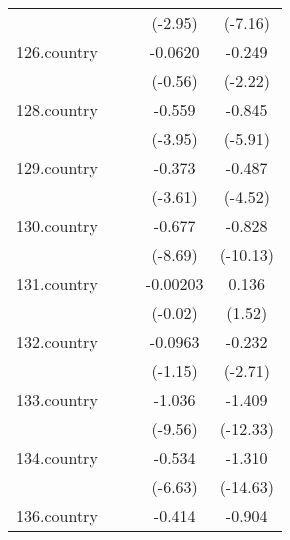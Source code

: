 {\begin{tabular}{l*{4}{c}}
            &                     &                     &     (-2.95)         &     (-7.16)         \\
[1em]
126.country &                     &                     &     -0.0620         &      -0.249\sym{*}  \\
            &                     &                     &     (-0.56)         &     (-2.22)         \\
[1em]
128.country &                     &                     &      -0.559\sym{***}&      -0.845\sym{***}\\
            &                     &                     &     (-3.95)         &     (-5.91)         \\
[1em]
129.country &                     &                     &      -0.373\sym{***}&      -0.487\sym{***}\\
            &                     &                     &     (-3.61)         &     (-4.52)         \\
[1em]
130.country &                     &                     &      -0.677\sym{***}&      -0.828\sym{***}\\
            &                     &                     &     (-8.69)         &    (-10.13)         \\
[1em]
131.country &                     &                     &    -0.00203         &       0.136         \\
            &                     &                     &     (-0.02)         &      (1.52)         \\
[1em]
132.country &                     &                     &     -0.0963         &      -0.232\sym{**} \\
            &                     &                     &     (-1.15)         &     (-2.71)         \\
[1em]
133.country &                     &                     &      -1.036\sym{***}&      -1.409\sym{***}\\
            &                     &                     &     (-9.56)         &    (-12.33)         \\
[1em]
134.country &                     &                     &      -0.534\sym{***}&      -1.310\sym{***}\\
            &                     &                     &     (-6.63)         &    (-14.63)         \\
[1em]
136.country &                     &                     &      -0.414\sym{*}  &      -0.904\sym{***}\\

\end{tabular}}
